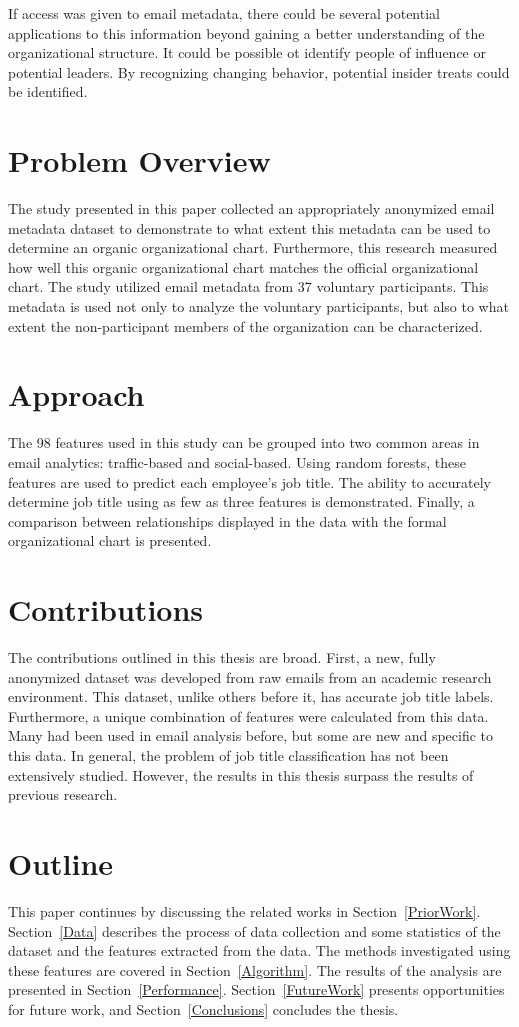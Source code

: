 \documentclass[12pt]{report}
\begin{document}
If access was given to email metadata, there could be several potential applications to this information beyond gaining a better understanding of the organizational structure.  It could be possible ot identify people of influence or potential leaders.  By recognizing changing behavior, potential insider treats could be identified.

\section{Problem Overview}
The study presented in this paper collected an appropriately anonymized email metadata dataset to demonstrate to what extent this metadata can be used to determine an organic organizational chart.
Furthermore, this research measured how well this organic organizational chart matches the official organizational chart.
The study utilized email metadata from 37 voluntary participants.
This metadata is used not only to analyze the voluntary participants, but also to what extent the non-participant members of the organization can be characterized.
\section{Approach}
The 98 features used in this study can be grouped into two common areas in email analytics: traffic-based and social-based.
Using random forests, these features are used to predict each employee's job title.
The ability to accurately determine job title using as few as three features is demonstrated.
Finally, a comparison between relationships displayed in the data with the formal organizational chart is presented.  
\section{Contributions}
The contributions outlined in this thesis are broad.  First, a new, fully anonymized dataset was developed from raw emails from an academic research environment.  This dataset, unlike others before it, has accurate job title labels.  Furthermore, a unique combination of features were calculated from this data.  Many had been used in email analysis before, but some are new and specific to this data.  In general, the problem of job title classification has not been extensively studied.  However, the results in this thesis surpass the results of previous research.
\section{Outline}
This paper continues by discussing the related works in Section~\ref{PriorWork}.  
Section~\ref{Data} describes the process of data collection and some statistics of the dataset and the features extracted from the data.
The methods investigated using these features are covered in Section~\ref{Algorithm}.
The results of the analysis are presented in Section~\ref{Performance}.
 Section~\ref{FutureWork} presents opportunities for future work, and Section~\ref{Conclusions} concludes the thesis.
\end{document}
